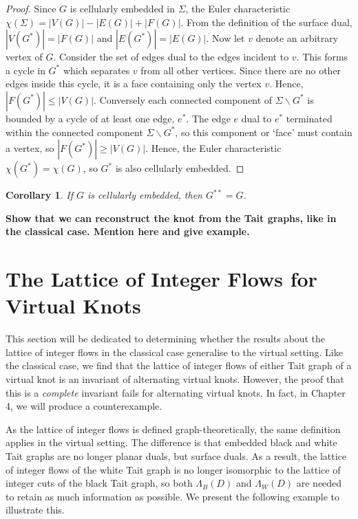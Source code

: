 \documentclass[12pt]{report}
\newcommand{\notered}[1]{{\color{Red} \textbf{#1}}}
\newtheorem*{corollary}{Corollary}
\theoremstyle{upright}
\begin{document}
\begin{proof}
Since $G$ is cellularly embedded in $\Sigma$, the Euler characteristic $\chi(\Sigma) = |V(G)| - |E(G)| + |F(G)|$. From the definition of the surface dual, $|V(G^{*})| = |F(G)|$ and $|E(G^{*})| = |E(G)|$. Now let $v$ denote an arbitrary vertex of $G$. Consider the set of edges dual to the edges incident to $v$. This forms a cycle in $G^{*}$ which separates $v$ from all other vertices. Since there are no other edges inside this cycle, it is a face containing only the vertex $v$. Hence, $|F(G^{*})| \leq |V(G)|$. Conversely each connected component of $\Sigma \smallsetminus G^{*}$ is bounded by a cycle of at least one edge, $e^{*}$. The edge $e$ dual to $e^{*}$ terminated within the connected component $\Sigma \smallsetminus G^{*}$, so this component or `face' must contain a vertex, so $|F(G^{*})| \geq |V(G)|$. Hence, the Euler characteristic $\chi(G^{*}) = \chi(G)$, so $G^{*}$ is also cellularly embedded.
\end{proof}

\begin{corollary}
If $G$ is cellularly embedded, then $G^{**} = G$.
\end{corollary}

\notered{Show that we can reconstruct the knot from the Tait graphs, like in the classical case. Mention here and give example.}

\section{The Lattice of Integer Flows for Virtual Knots}

This section will be dedicated to determining whether the results about the lattice of integer flows in the classical case generalise to the virtual setting. Like the classical case, we find that the lattice of integer flows of either Tait graph of a virtual knot is an invariant of alternating virtual knots. However, the proof that this is a \textit{complete} invariant fails for alternating virtual knots. In fact, in Chapter 4, we will produce a counterexample.

As the lattice of integer flows is defined graph-theoretically, the same definition applies in the virtual setting. The difference is that embedded black and white Tait graphs are no longer planar duals, but surface duals. As a result, the lattice of integer flows of the white Tait graph is no longer isomorphic to the lattice of integer cuts of the black Tait graph, so both $\Lambda_{B}(D)$ and $\Lambda_{W}(D)$ are needed to retain as much information as possible. We present the following example to illustrate this.
\end{document}
